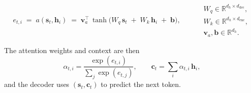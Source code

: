 \documentclass{article}
\begin{document}
\begin{equation}
\label{eq:bahdanau}
e_{t,i}
\;=\;
a(\bm{s}_t,\bm{h}_i)
\;=\;
\bm{v}_a^{\!\top}\,
\tanh\!\big(
W_q\,\bm{s}_t \;+\; W_k\,\bm{h}_i \;+\; \bm{b}
\big),
\qquad
\begin{aligned}
&W_q \in \mathbb{R}^{d_h\times d_{\text{dec}}},\\
&W_k \in \mathbb{R}^{d_h\times d_{\text{enc}}},\\
&\bm{v}_a,\bm{b}\in\mathbb{R}^{d_h}.
\end{aligned}
\end{equation}

\noindent The attention weights and context are then
\begin{equation}
\alpha_{t,i}
=\frac{\exp(e_{t,i})}{\sum_{j}\exp(e_{t,j})},
\qquad
\bm{c}_t=\sum_{i}\alpha_{t,i}\,\bm{h}_i,
\end{equation}
and the decoder uses \((\bm{s}_t,\bm{c}_t)\) to predict the next token.
\end{document}
